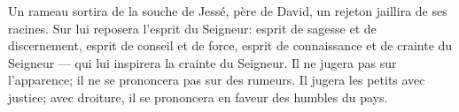 Un rameau sortira de la souche de Jessé, père de David,
	un rejeton jaillira de ses racines.
Sur lui reposera l’esprit du Seigneur:
	esprit de sagesse et de discernement,
	esprit de conseil et de force,
	esprit de connaissance et de crainte du Seigneur
	--- qui lui inspirera la crainte du Seigneur.
Il ne jugera pas sur l’apparence;
	il ne se prononcera pas sur des rumeurs.
Il jugera les petits avec justice;
	avec droiture, il se prononcera en faveur des humbles du pays.
